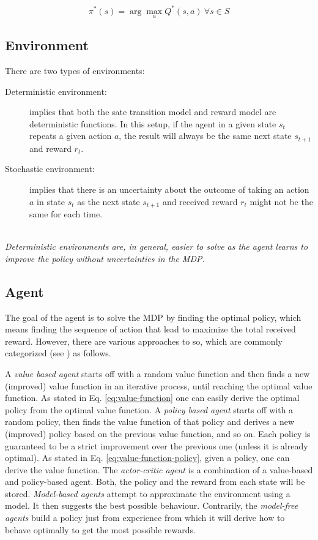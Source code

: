 \begin{equation}
\pi^*(s)=\arg \max_{a} Q^*(s, a)\ \forall{s}\in{S}
\end{equation}

\subsection{Environment}
\label{sec:rl-environment}

There are two types of environments:
\begin{description}
    \item[Deterministic environment:] implies that both the sate transition model and reward model are deterministic functions. 
    In this setup, if the agent in a given state $s_t$ repeats a given action $a$, the result will always be the same next state $s_{t+1}$ and reward $r_t$.

    \item[Stochastic environment:] implies that there is an uncertainty about the outcome of taking an action $a$ in state $s_t$ as the next state $s_{t+1}$ and received reward $r_t$ might not be the same for each time.
\end{description}
\hfill
\\
\textit{Deterministic environments are, in general, easier to solve as the agent learns to improve the policy without uncertainties in the MDP. }

\subsection{Agent}

The goal of the agent is to solve the MDP by finding the optimal policy, which means finding the sequence of action that lead to maximize the total received reward.
However, there are various approaches to so, which are commonly categorized (see \cite{rl-demysitifed2}) as follows.

A \textit{value based agent} starts off with a random value function and then finds a new (improved) value function in an iterative process, until reaching the optimal value function. 
As stated in Eq. \ref{eq:value-function} one can easily derive the optimal policy from the optimal value function. 
A \textit{policy based agent} starts off with a random policy, then finds the value function of that policy and derives a new (improved) policy based on the previous value function, and so on. Each policy is guaranteed to be a strict improvement over the previous one (unless it is already optimal). As stated in Eq. \ref{eq:value-function-policy}, given a policy, one can derive the value function.
The \textit{actor-critic agent} is a combination of a value-based and policy-based agent. Both, the policy and the reward from each state will be stored.
\textit{Model-based agents} attempt to approximate the environment using a model. It then suggests the best possible behaviour.
Contrarily, the \textit{model-free agents} build a policy just from experience from which it will derive how to behave optimally to get the most possible rewards.


